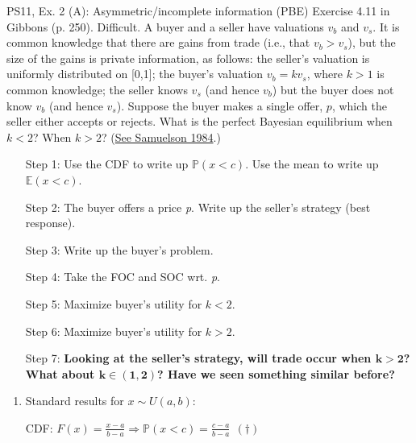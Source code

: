 \begin{frame}{PS11, Ex. 2 (A): Asymmetric/incomplete information (PBE)}
    Exercise 4.11 in Gibbons (p. 250). Difficult. A buyer and a seller have valuations $v_b$ and $v_s$. It is common knowledge that there are gains from trade (i.e., that $v_b > v_s$), but the size of the gains is private information, as follows: the seller’s valuation is uniformly distributed on [0,1]; the buyer’s valuation $v_b = kv_s$, where $k > 1$ is common knowledge; the seller knows $v_s$ (and hence $v_b$) but the buyer does not know $v_b$ (and hence $v_s$). Suppose the buyer makes a single offer, $p$, which the seller either accepts or rejects. What is the perfect Bayesian equilibrium when $k < 2$? When $k > 2$? (\href{https://www.jstor.org/stable/1911195}{See Samuelson 1984}.) \vspace{-8pt}
    \begin{multicols}{2}
      \begin{itemize}
        \item[Step 1:] Use the CDF to write up $\mathbb{P}(x<c)$. Use the mean to write up $\mathbb{E}(x<c)$.
        \item[Step 2:] \vspace{-2pt} The buyer offers a price \textit{p}. Write up the seller's strategy (best response).
        \item[Step 3:] \vspace{-2pt} Write up the buyer's problem.
        \item[Step 4:] \vspace{-2pt} Take the FOC and SOC wrt. \textit{p}.
        \item[Step 5:] \vspace{-2pt} Maximize buyer's utility for $k<2$.
        \item[Step 6:] \vspace{-2pt} Maximize buyer's utility for $k>2$.
        \item[Step 7:] \vspace{-2pt} \textbf{Looking at the seller's strategy, will trade occur when $\bm{k>2}$?\\
        What about $\bm{k\in(1,2)}$? Have we seen something similar before?}
      \end{itemize}
      \vfill\null\columnbreak
      \begin{enumerate}
        \item \vspace{-2pt} Standard results for $x\sim U(a, b):$
        \item[CDF:] \vspace{-2pt} $F(x)=\frac{x-a}{b-a}\Rightarrow\mathbb{P}(x<c)=\frac{c-a}{b-a}\ \ (\dagger)$

\end{enumerate}
\end{multicols}
\end{frame}
